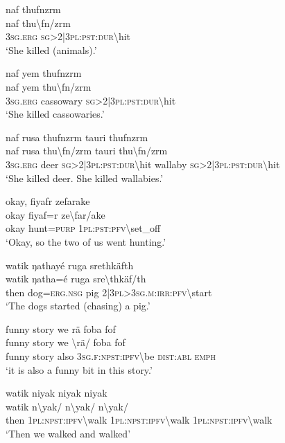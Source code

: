 \ea\label{ex:14:a2941}
naf thufnzrm\\
\gll naf	thu{\textbackslash}fn/zrm\\
     3\textsc{sg}.\textsc{erg}	\textsc{sg}>2|3\textsc{pl}:\textsc{pst}:\textsc{dur}{\textbackslash}hit\\
\glt `She killed (animals).'
\z

\ea\label{ex:14:a2942}
naf yem thufnzrm\\
\gll naf	yem	thu{\textbackslash}fn/zrm\\
     3\textsc{sg}.\textsc{erg}	cassowary	\textsc{sg}>2|3\textsc{pl}:\textsc{pst}:\textsc{dur}{\textbackslash}hit\\
\glt `She killed cassowaries.'
\z

\ea\label{ex:14:a2943}
naf rusa thufnzrm tauri thufnzrm\\
\gll naf	rusa	thu{\textbackslash}fn/zrm	tauri	thu{\textbackslash}fn/zrm\\
     3\textsc{sg}.\textsc{erg}	deer	\textsc{sg}>2|3\textsc{pl}:\textsc{pst}:\textsc{dur}{\textbackslash}hit	wallaby	\textsc{sg}>2|3\textsc{pl}:\textsc{pst}:\textsc{dur}{\textbackslash}hit\\
\glt `She killed deer. She killed wallabies.'
\z

\ea\label{ex:14:a2944}
okay, fiyafr zefarake\\
\gll okay	fiyaf=r	ze{\textbackslash}far/ake\\
     okay	hunt=\textsc{purp}	1\textsc{pl}:\textsc{pst}:\textsc{pfv}{\textbackslash}set\_off\\
\glt `Okay, so the two of us went hunting.'
\z

\ea\label{ex:14:a2945}
watik ŋathayé ruga srethkäfth\\
\gll watik	ŋatha=é	ruga	sre{\textbackslash}thkäf/th\\
     then	dog=\textsc{erg}.\textsc{nsg}	pig	2|3\textsc{pl}>3\textsc{sg}.\textsc{m}:\textsc{irr}:\textsc{pfv}{\textbackslash}start\\
\glt `The dogs started (chasing) a pig.'
\z

\ea\label{ex:14:a2946}
funny story we rä foba fof\\
\gll funny	story	we	{\textbackslash}rä/	foba	fof\\
     funny	story	also	3\textsc{sg}.\textsc{f}:\textsc{npst}:\textsc{ipfv}{\textbackslash}be	\textsc{dist}:\textsc{abl}	\textsc{emph}\\
\glt `it is also a funny bit in this story.'
\z

\ea\label{ex:14:a2947}
watik niyak niyak niyak\\
\gll watik	n{\textbackslash}yak/	n{\textbackslash}yak/	n{\textbackslash}yak/\\
     then	1\textsc{pl}:\textsc{npst}:\textsc{ipfv}{\textbackslash}walk	1\textsc{pl}:\textsc{npst}:\textsc{ipfv}{\textbackslash}walk	1\textsc{pl}:\textsc{npst}:\textsc{ipfv}{\textbackslash}walk\\
\glt `Then we walked and walked'
\z


